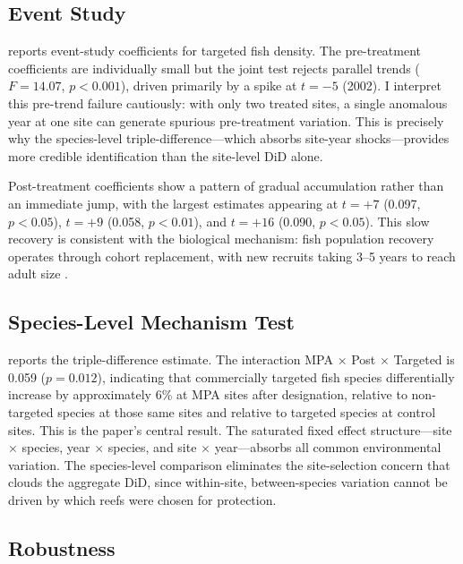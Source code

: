 \documentclass[12pt]{article}
\begin{document}
\subsection{Event Study}



 reports event-study coefficients for targeted fish density. The pre-treatment coefficients are individually small but the joint test rejects parallel trends ($F = 14.07$, $p < 0.001$), driven primarily by a spike at $t = -5$ (2002). I interpret this pre-trend failure cautiously: with only two treated sites, a single anomalous year at one site can generate spurious pre-treatment variation. This is precisely why the species-level triple-difference---which absorbs site-year shocks---provides more credible identification than the site-level DiD alone.

Post-treatment coefficients show a pattern of gradual accumulation rather than an immediate jump, with the largest estimates appearing at $t = +7$ (0.097, $p < 0.05$), $t = +9$ (0.058, $p < 0.01$), and $t = +16$ (0.090, $p < 0.05$). This slow recovery is consistent with the biological mechanism: fish population recovery operates through cohort replacement, with new recruits taking 3--5 years to reach adult size \citep{lester2009biological}.

\subsection{Species-Level Mechanism Test}



 reports the triple-difference estimate. The interaction MPA $\times$ Post $\times$ Targeted is 0.059 ($p = 0.012$), indicating that commercially targeted fish species differentially increase by approximately 6\% at MPA sites after designation, relative to non-targeted species at those same sites and relative to targeted species at control sites. This is the paper's central result. The saturated fixed effect structure---site $\times$ species, year $\times$ species, and site $\times$ year---absorbs all common environmental variation. The species-level comparison eliminates the site-selection concern that clouds the aggregate DiD, since within-site, between-species variation cannot be driven by which reefs were chosen for protection.

\subsection{Robustness}
\end{document}
